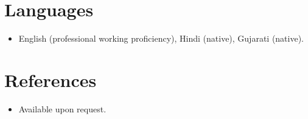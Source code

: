 \documentclass[11pt,a4paper,sans]{moderncv}
\begin{document}

\section{Languages}
\vspace{1pt}
\begin{itemize}
\item English (professional working proficiency), Hindi (native), Gujarati (native).
\end{itemize}


\section{References}
\vspace{1pt}
\begin{itemize}
\item{Available upon request.}
\end{itemize}
\end{document}
